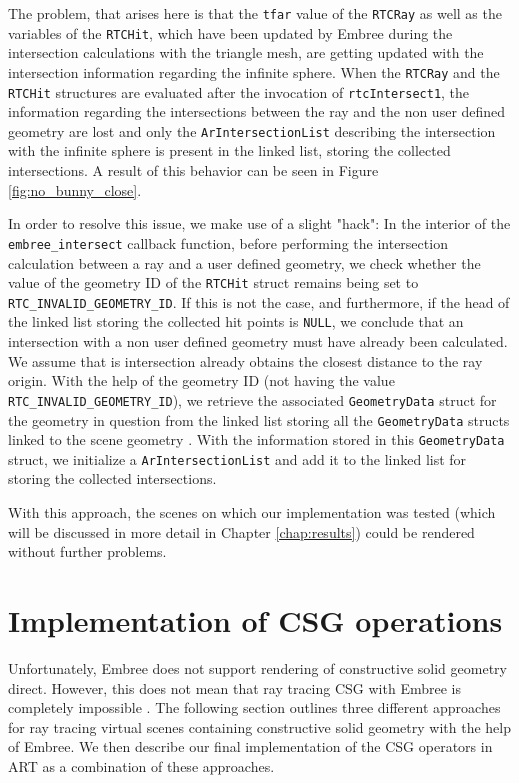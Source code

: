 The problem, that arises here is that the \texttt{tfar} value of the \texttt{RTCRay} as well as the variables of the \texttt{RTCHit}, which have been updated by Embree during the intersection calculations with the triangle mesh, are getting updated with the intersection information regarding the infinite sphere. When the \texttt{RTCRay} and the \texttt{RTCHit} structures are evaluated after the invocation of \texttt{rtcIntersect1}, the information regarding the intersections between the ray and the non user defined geometry are lost and only the \texttt{ArIntersectionList} describing the intersection with the infinite sphere is present in the linked list, storing the collected intersections. A result of this behavior can be seen in Figure \ref{fig:no_bunny_close}. 

In order to resolve this issue, we make use of a slight "hack": In the interior of the \texttt{embree\_intersect} callback function, before performing the intersection calculation between a ray and a user defined geometry, we check whether the value of the geometry ID of the \texttt{RTCHit} struct remains being set to \texttt{RTC\_INVALID\_GEOMETRY\_ID}. If this is not the case, and furthermore, if the head of the linked list storing the collected hit points is \texttt{NULL}, we conclude that an intersection with a non user defined geometry must have already been calculated. We assume that is intersection already obtains the closest distance to the ray origin. With the help of the geometry ID (not having the value \texttt{RTC\_INVALID\_GEOMETRY\_ID}), we retrieve the associated \texttt{GeometryData} struct  for the geometry in question from the linked list storing all the \texttt{GeometryData} structs linked to the scene geometry . With the information stored in this \texttt{GeometryData} struct, we initialize a \texttt{ArIntersectionList} and add it to the linked list for storing the collected intersections.

With this approach, the scenes on which our implementation was tested (which will be discussed in more detail in Chapter \ref{chap:results}) could be rendered without further problems.


\section{Implementation of CSG operations}
\label{sec:embree_csg}

Unfortunately, Embree does not support rendering of constructive solid geometry direct. However, this does not mean that ray tracing CSG with Embree is completely impossible . The following section outlines three different approaches for ray tracing virtual scenes containing constructive solid geometry with the help of Embree. We then describe our final implementation of the CSG operators in ART as a combination of these approaches.

